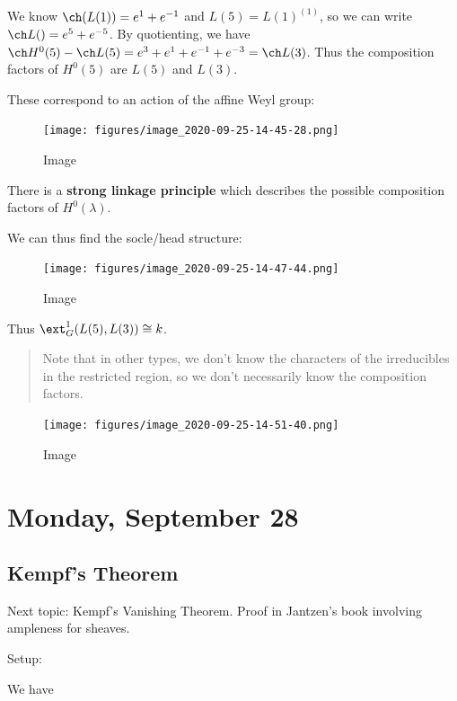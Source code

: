 \begin{example}
We know \(\ch(L(1)) = e^1 + e^{-1}\) and \(L(5) = L(1)^{(1)}\), so we
can write \(\ch L() = e^{5} + e^{-5}\). By quotienting, we have
\(\ch H^0(5) - \ch L(5) = e^3 + e^1 + e^{-1} +e^{-3} = \ch L(3)\). Thus
the composition factors of \(H^0(5)\) are \(L(5)\) and \(L(3)\).

These correspond to an action of the affine Weyl group:

\begin{figure}
\centering
\texttt{[image: figures/image\_2020-09-25-14-45-28.png]}
\caption{Image}
\end{figure}

There is a \textbf{strong linkage principle} which describes the
possible composition factors of \(H^0(\lambda)\).

We can thus find the socle/head structure:

\begin{figure}
\centering
\texttt{[image: figures/image\_2020-09-25-14-47-44.png]}
\caption{Image}
\end{figure}

Thus \(\ext_G^1(L(5), L(3)) \cong k\).

\end{example}

\begin{quote}
Note that in other types, we don't know the characters of the
irreducibles in the restricted region, so we don't necessarily know the
composition factors.
\end{quote}

\begin{figure}
\centering
\texttt{[image: figures/image\_2020-09-25-14-51-40.png]}
\caption{Image}
\end{figure}

\hypertarget{monday-september-28}{%
\section{Monday, September 28}\label{monday-september-28}}

\hypertarget{kempfs-theorem}{%
\subsection{Kempf's Theorem}\label{kempfs-theorem}}

Next topic: Kempf's Vanishing Theorem. Proof in Jantzen's book involving
ampleness for sheaves.

Setup:

We have


